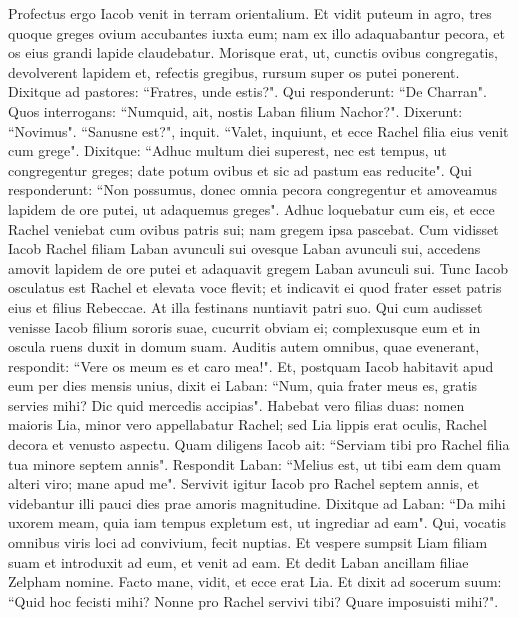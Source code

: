 \begin{biblechapter}  
\verse Profectus ergo Iacob venit in terram orientalium. 
\verse Et vidit puteum in agro, tres quoque greges ovium accubantes iuxta eum; nam ex illo adaquabantur pecora, et os eius grandi lapide claudebatur. 
\verse Morisque erat, ut, cunctis ovibus congregatis, devolverent lapidem et, refectis gregibus, rursum super os putei ponerent. 
\verse Dixitque ad pastores: “Fratres, unde estis?". Qui responderunt: “De Charran". 
\verse Quos interrogans: “Numquid, ait, nostis Laban filium Nachor?". Dixerunt: “Novimus". 
\verse “Sanusne est?", inquit. “Valet, inquiunt, et ecce Rachel filia eius venit cum grege". 
\verse Dixitque: “Adhuc multum diei superest, nec est tempus, ut congregentur greges; date potum ovibus et sic ad pastum eas reducite". 
\verse Qui responderunt: “Non possumus, donec omnia pecora congregentur et amoveamus lapidem de ore putei, ut adaquemus greges". 
\verse Adhuc loquebatur cum eis, et ecce Rachel veniebat cum ovibus patris sui; nam gregem ipsa pascebat. 
\verse Cum vidisset Iacob Rachel filiam Laban avunculi sui ovesque Laban avunculi sui, accedens amovit lapidem de ore putei 
\verse et adaquavit gregem Laban avunculi sui. Tunc Iacob osculatus est Rachel et elevata voce flevit; 
\verse et indicavit ei quod frater esset patris eius et filius Rebeccae. At illa festinans nuntiavit patri suo. 
\verse Qui cum audisset venisse Iacob filium sororis suae, cucurrit obviam ei; complexusque eum et in oscula ruens duxit in domum suam. Auditis autem omnibus, quae evenerant, 
\verse respondit: “Vere os meum es et caro mea!". Et, postquam Iacob habitavit apud eum per dies mensis unius, 
\verse dixit ei Laban: “Num, quia frater meus es, gratis servies mihi? Dic quid mercedis accipias". 
\verse Habebat vero filias duas: nomen maioris Lia, minor vero appellabatur Rachel; 
\verse sed Lia lippis erat oculis, Rachel decora et venusto aspectu. 
\verse Quam diligens Iacob ait: “Serviam tibi pro Rachel filia tua minore septem annis". 
\verse Respondit Laban: “Melius est, ut tibi eam dem quam alteri viro; mane apud me". 
\verse Servivit igitur Iacob pro Rachel septem annis, et videbantur illi pauci dies prae amoris magnitudine. 
\verse Dixitque ad Laban: “Da mihi uxorem meam, quia iam tempus expletum est, ut ingrediar ad eam". 
\verse Qui, vocatis omnibus viris loci ad convivium, fecit nuptias. 
\verse Et vespere sumpsit Liam filiam suam et introduxit ad eum, et venit ad eam. 
\verse Et dedit Laban ancillam filiae Zelpham nomine. Facto mane, vidit, et ecce erat Lia. 
\verse Et dixit ad socerum suum: “Quid hoc fecisti mihi? Nonne pro Rachel servivi tibi? Quare imposuisti mihi?". 

\end{biblechapter}
